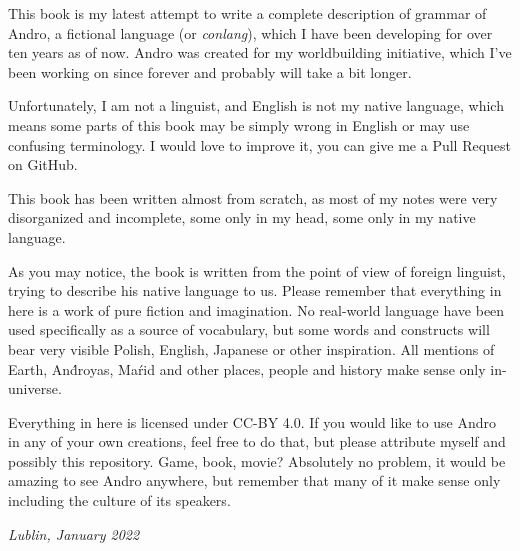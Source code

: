 This book is my latest attempt to write a complete description of grammar of
Andro, a fictional language (or \emph{conlang}), which I have been developing
for over ten years as of now. Andro was created for my worldbuilding initiative,
which I've been working on since forever and probably will take a bit longer.

Unfortunately, I am not a linguist, and English is not my native language, which
means some parts of this book may be simply wrong in English or may use
confusing terminology. I would love to improve it, you can give me a Pull
Request on GitHub.

This book has been written almost from scratch, as most of my notes were very
disorganized and incomplete, some only in my head, some only in my native
language.

As you may notice, the book is written from the point of view of foreign
linguist, trying to describe his native language to us. Please remember that
everything in here is a work of pure fiction and imagination. No real-world
language have been used specifically as a source of vocabulary, but some words
and constructs will bear very visible Polish, English, Japanese or other
inspiration. All mentions of Earth, And́royas, Maŕid and other places, people
and history make sense only in-universe.

Everything in here is licensed under CC-BY 4.0. If you would like to use Andro
in any of your own creations, feel free to do that, but please attribute myself
and possibly this repository. Game, book, movie? Absolutely no problem, it would
be amazing to see Andro anywhere, but remember that many of it make sense only
including the culture of its speakers.

\begin{flushright}\itshape\footnotesize
Lublin, January 2022
\end{flushright}